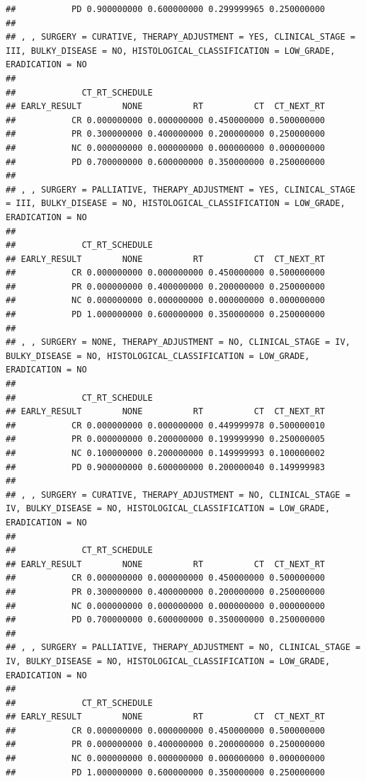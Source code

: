 \documentclass[]{article}
\begin{document}
\begin{verbatim}
##           PD 0.900000000 0.600000000 0.299999965 0.250000000
## 
## , , SURGERY = CURATIVE, THERAPY_ADJUSTMENT = YES, CLINICAL_STAGE = III, BULKY_DISEASE = NO, HISTOLOGICAL_CLASSIFICATION = LOW_GRADE, ERADICATION = NO
## 
##             CT_RT_SCHEDULE
## EARLY_RESULT        NONE          RT          CT  CT_NEXT_RT
##           CR 0.000000000 0.000000000 0.450000000 0.500000000
##           PR 0.300000000 0.400000000 0.200000000 0.250000000
##           NC 0.000000000 0.000000000 0.000000000 0.000000000
##           PD 0.700000000 0.600000000 0.350000000 0.250000000
## 
## , , SURGERY = PALLIATIVE, THERAPY_ADJUSTMENT = YES, CLINICAL_STAGE = III, BULKY_DISEASE = NO, HISTOLOGICAL_CLASSIFICATION = LOW_GRADE, ERADICATION = NO
## 
##             CT_RT_SCHEDULE
## EARLY_RESULT        NONE          RT          CT  CT_NEXT_RT
##           CR 0.000000000 0.000000000 0.450000000 0.500000000
##           PR 0.000000000 0.400000000 0.200000000 0.250000000
##           NC 0.000000000 0.000000000 0.000000000 0.000000000
##           PD 1.000000000 0.600000000 0.350000000 0.250000000
## 
## , , SURGERY = NONE, THERAPY_ADJUSTMENT = NO, CLINICAL_STAGE = IV, BULKY_DISEASE = NO, HISTOLOGICAL_CLASSIFICATION = LOW_GRADE, ERADICATION = NO
## 
##             CT_RT_SCHEDULE
## EARLY_RESULT        NONE          RT          CT  CT_NEXT_RT
##           CR 0.000000000 0.000000000 0.449999978 0.500000010
##           PR 0.000000000 0.200000000 0.199999990 0.250000005
##           NC 0.100000000 0.200000000 0.149999993 0.100000002
##           PD 0.900000000 0.600000000 0.200000040 0.149999983
## 
## , , SURGERY = CURATIVE, THERAPY_ADJUSTMENT = NO, CLINICAL_STAGE = IV, BULKY_DISEASE = NO, HISTOLOGICAL_CLASSIFICATION = LOW_GRADE, ERADICATION = NO
## 
##             CT_RT_SCHEDULE
## EARLY_RESULT        NONE          RT          CT  CT_NEXT_RT
##           CR 0.000000000 0.000000000 0.450000000 0.500000000
##           PR 0.300000000 0.400000000 0.200000000 0.250000000
##           NC 0.000000000 0.000000000 0.000000000 0.000000000
##           PD 0.700000000 0.600000000 0.350000000 0.250000000
## 
## , , SURGERY = PALLIATIVE, THERAPY_ADJUSTMENT = NO, CLINICAL_STAGE = IV, BULKY_DISEASE = NO, HISTOLOGICAL_CLASSIFICATION = LOW_GRADE, ERADICATION = NO
## 
##             CT_RT_SCHEDULE
## EARLY_RESULT        NONE          RT          CT  CT_NEXT_RT
##           CR 0.000000000 0.000000000 0.450000000 0.500000000
##           PR 0.000000000 0.400000000 0.200000000 0.250000000
##           NC 0.000000000 0.000000000 0.000000000 0.000000000
##           PD 1.000000000 0.600000000 0.350000000 0.250000000

\end{verbatim}
\end{document}
